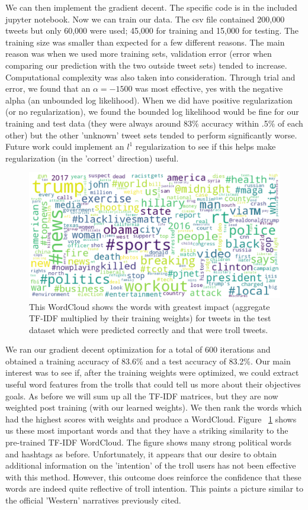 \documentclass[runningheads]{llncs}
\begin{document}
We can then implement the gradient decent. The specific code is in the included jupyter notebook.
Now we can train our data. The csv file contained 200,000 tweets but only 60,000 were used; 45,000 for training and 15,000 for testing.  The training size was smaller than expected for a few different reasons. The main reason was when we used more training sets, validation error (error when comparing our prediction with the two outside tweet sets) tended to increase. Computational complexity was also taken into consideration. Through trial and error, we found that an $\alpha=-1500$ was most effective, yes with the negative alpha (an unbounded log likelihood). When we did have positive regularization (or no regularization), we found the bounded log likelihood would be fine for our training and test data (they were always around 83\% accuracy within .5\% of each other) but the other 'unknown' tweet sets tended to perform significantly worse. Future work could implement an $l^1$ regularization to see if this helps make regularization (in the 'correct' direction) useful.
\begin{figure}
\centering
\includegraphics[width=\textwidth]{test_troll.eps}
\caption{This WordCloud shows the words with greatest impact (aggregate TF-IDF multiplied by their training weights) for tweets in the test dataset which were predicted correctly and that were troll tweets.
} \label{test_troll.eps}
\end{figure}
We ran our gradient decent optimization for a total of 600 iterations and obtained a training accuracy of 83.6\% and a test accuracy of 83.2\%.
Our main interest was to see if, after the training weights were optimized, we could extract useful word features from the trolls that could tell us more about their objectives goals. As before we will sum up all the TF-IDF matrices, but they are now weighted post training (with our learned weights). We then rank the words which had the highest scores with weights and produce a WordCloud. Figure ~\ref{test_troll.eps} shows us these most important words and that they have a striking similarity to the pre-trained TF-IDF WordCloud. The figure shows many strong political words and hashtags as before. Unfortunately, it appears that our desire to obtain additional information on the 'intention' of the troll users has not been effective with this method. However, this outcome does reinforce the confidence that these words are indeed quite reflective of troll intention. This paints a picture similar to the official 'Western' narratives previously cited.~\cite{ref_article1}~\cite{ref_url1}
\end{document}
